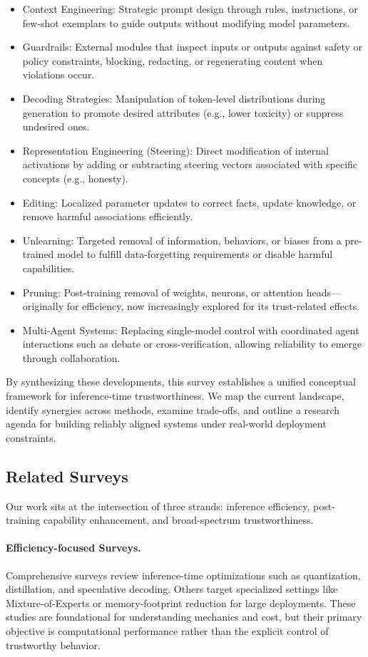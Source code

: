 {\begin{itemize}
\item Context Engineering: Strategic prompt design through rules, instructions, or few-shot exemplars to guide outputs without modifying model parameters.
\item Guardrails: External modules that inspect inputs or outputs against safety or policy constraints, blocking, redacting, or regenerating content when violations occur.
\item Decoding Strategies: Manipulation of token-level distributions during generation to promote desired attributes (e.g., lower toxicity) or suppress undesired ones.
\item Representation Engineering (Steering): Direct modification of internal activations by adding or subtracting steering vectors associated with specific concepts (e.g., honesty).
\item Editing: Localized parameter updates to correct facts, update knowledge, or remove harmful associations efficiently.
\item Unlearning: Targeted removal of information, behaviors, or biases from a pre-trained model to fulfill data-forgetting requirements or disable harmful capabilities.
\item Pruning: Post-training removal of weights, neurons, or attention heads—originally for efficiency, now increasingly explored for its trust-related effects.
\item Multi-Agent Systems: Replacing single-model control with coordinated agent interactions such as debate or cross-verification, allowing reliability to emerge through collaboration.
\end{itemize}

By synthesizing these developments, this survey establishes a unified conceptual framework for inference-time trustworthiness. We map the current landscape, identify synergies across methods, examine trade-offs, and outline a research agenda for building reliably aligned systems under real-world deployment constraints.

\subsection{Related Surveys}
Our work sits at the intersection of three strands: inference efficiency, post-training capability enhancement, and broad-spectrum trustworthiness.

\paragraph{Efficiency-focused Surveys.}
Comprehensive surveys review inference-time optimizations such as quantization, distillation, and speculative decoding\citep{survey:inference_efficiency1}. Others target specialized settings like Mixture-of-Experts\citep{survey:inference_moe} or memory-footprint reduction for large deployments\citep{survey:inference_efficiency2}. These studies are foundational for understanding mechanics and cost, but their primary objective is computational performance rather than the explicit control of trustworthy behavior.

}

